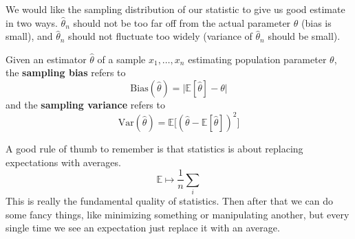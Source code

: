   We would like the sampling distribution of our statistic to give us good estimate in two ways. $\widehat{\theta}_n$ should not be too far off from the actual parameter $\theta$ (bias is small), and $\widehat{\theta}_n$ should not fluctuate too widely (variance of $\widehat{\theta}_n$ should be small). 

  \begin{definition}
    Given an estimator $\widehat{\theta}$ of a sample $x_1, \ldots, x_n$ estimating population parameter $\theta$, the \textbf{sampling bias} refers to 
    \begin{equation}
      \mathrm{Bias}(\widehat{\theta}) = \big| \mathbb{E}[\widehat{\theta}] - \theta \big|
    \end{equation}
    and the \textbf{sampling variance} refers to 
    \begin{equation}
      \mathrm{Var}(\widehat{\theta}) = \mathbb{E} \big[ (\widehat{\theta} - \mathbb{E}[\widehat{\theta}])^2 \big]
    \end{equation}
  \end{definition}

  A good rule of thumb to remember is that statistics is about replacing expectations with averages. 
  \begin{equation}
    \mathbb{E} \mapsto \frac{1}{n} \sum_i
  \end{equation}
  This is really the fundamental quality of statistics. Then after that we can do some fancy things, like minimizing something or manipulating another, but every single time we see an expectation just replace it with an average. 

